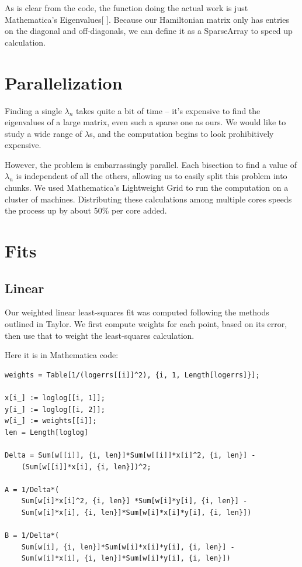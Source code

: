 \documentclass[12pt,twoside]{reedthesis}
\begin{document}
As is clear from the code, the function doing the actual work is just Mathematica's Eigenvalues[ ]. Because our Hamiltonian matrix only has entries on the diagonal and off-diagonals, we can define it as a SparseArray to speed up calculation. 

\section{Parallelization}

Finding a single $\lambda_{n}$ takes quite a bit of time -- it's expensive to find the eigenvalues of a large matrix, even such a sparse one as ours. We would like to study a wide range of $\lambda$s, and the computation begins to look prohibitively expensive.

However, the problem is embarrassingly parallel. Each bisection to find a value of $\lambda_n$ is independent of all the others, allowing us to easily split this problem into chunks. We used Mathematica's Lightweight Grid to run the computation on a cluster of machines. Distributing these calculations among multiple cores speeds the process up by about 50\% per core added. 

\section{Fits}
\subsection{Linear}
Our weighted linear least-squares fit was computed following the methods outlined in Taylor\cite{taylor_introduction_1997}. We first compute weights for each point, based on its error, then use that to weight the least-squares calculation.

Here it is in Mathematica code:
\begin{Verbatim}
weights = Table[1/(logerrs[[i]]^2), {i, 1, Length[logerrs]}];

x[i_] := loglog[[i, 1]];
y[i_] := loglog[[i, 2]];
w[i_] := weights[[i]]; 
len = Length[loglog]

Delta = Sum[w[[i]], {i, len}]*Sum[w[[i]]*x[i]^2, {i, len}] -
	(Sum[w[[i]]*x[i], {i, len}])^2;

A = 1/Delta*(
	Sum[w[i]*x[i]^2, {i, len}] *Sum[w[i]*y[i], {i, len}] - 
	Sum[w[i]*x[i], {i, len}]*Sum[w[i]*x[i]*y[i], {i, len}])
	
B = 1/Delta*(
	Sum[w[i], {i, len}]*Sum[w[i]*x[i]*y[i], {i, len}] - 
	Sum[w[i]*x[i], {i, len}]*Sum[w[i]*y[i], {i, len}])
\end{Verbatim}
\end{document}

